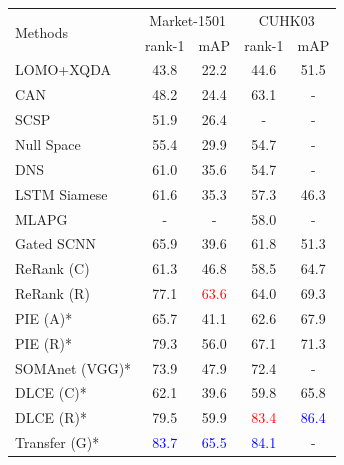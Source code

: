 \documentclass[10pt,twocolumn,letterpaper]{article}
\begin{document}
\setlength{\tabcolsep}{5pt}
\begin{table}[t]
\begin{center}
\begin{tabular}{l|cc|cc}
\hline
\multicolumn{1}{l|}{\multirow{2}{*}{Methods}}&\multicolumn{2}{c|}{Market-1501}&\multicolumn{2}{c}{CUHK03}\\
\cline{2-5}
\multicolumn{1}{c|}{}&rank-1&mAP&rank-1&mAP\\
\hline
\hline
LOMO+XQDA\cite{DBLP:conf/cvpr/LiaoHZL15}     &43.8&22.2      &44.6&51.5\\
CAN\cite{DBLP:journals/corr/LiuFQJY16}           &48.2&24.4      &63.1&-   \\
SCSP\cite{DBLP:conf/cvpr/ChenYCZ16}          &51.9&26.4      &-   &-   \\
Null Space\cite{DBLP:conf/cvpr/ZhangXG16}    &55.4&29.9      &54.7&-   \\
DNS\cite{DBLP:conf/cvpr/ZhangXG16}           &61.0&35.6      &54.7&-   \\
LSTM Siamese\cite{DBLP:conf/eccv/VariorSLXW16}  &61.6&35.3      &57.3&46.3\\
MLAPG\cite{DBLP:conf/iccv/LiaoL15}         &-   &-         &58.0&-   \\
Gated SCNN\cite{DBLP:conf/eccv/VariorHW16}    &65.9&39.6      &61.8&51.3\\
ReRank (C) \cite{DBLP:conf/cvpr/ZhongZCL17}     &61.3&46.8      &58.5&64.7\\
ReRank (R) \cite{DBLP:conf/cvpr/ZhongZCL17}     &77.1&\textcolor{red}{63.6}      &64.0&69.3\\
\hline
PIE (A)* \cite{DBLP:journals/corr/ZhengHLY17}        &65.7&41.1      &62.6&67.9\\
PIE (R)* \cite{DBLP:journals/corr/ZhengHLY17}        &79.3&56.0      &67.1&71.3\\
SOMAnet (VGG)* \cite{barbosa2017looking} &73.9&47.9&72.4&-\\
DLCE (C)* \cite{DBLP:journals/corr/ZhengZY16}       &62.1&39.6      &59.8&65.8\\
DLCE (R)* \cite{DBLP:journals/corr/ZhengZY16}       &79.5&59.9      &\textcolor{red}{83.4}&\textcolor{blue}{86.4}\\
Transfer (G)* \cite{geng2016deep}  &\textcolor{blue}{83.7}&\textcolor{blue}{65.5}      &\textcolor{blue}{84.1}&-\\
\hline

\end{tabular}
\end{center}
\end{table}
\end{document}
